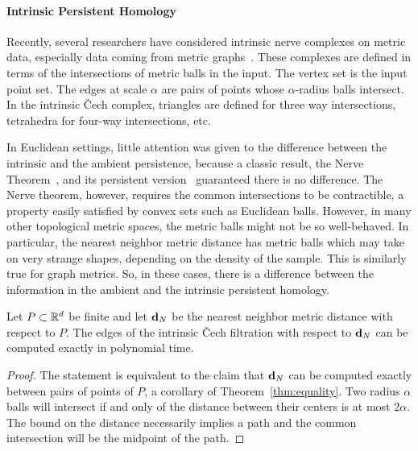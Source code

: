 

  \paragraph*{Intrinsic Persistent Homology}
    Recently, several researchers have considered intrinsic nerve complexes on metric data, especially data coming from metric graphs~\cite{adamszek16nerve,gasparovic17complete}.
    These complexes are defined in terms of the intersections of metric balls in the input.
    The vertex set is the input point set.
    The edges at scale $\alpha$ are pairs of points whose $\alpha$-radius balls intersect.
    In the intrinsic \v Cech complex, triangles are defined for three way intersections, tetrahedra for four-way intersections, etc.

    In Euclidean settings, little attention was given to the difference between the intrinsic and the ambient persistence, because a classic result, the Nerve Theorem~\cite{borsuk48imbedding}, and its persistent version~\cite{chazal08towards} guaranteed there is no difference.
    The Nerve theorem, however, requires the common intersections to be contractible, a property easily satisfied by convex sets such as Euclidean balls.
    However, in many other topological metric spaces, the metric
    balls might not be so well-behaved.
    In particular, the nearest neighbor metric distance has metric balls which may take on very strange shapes, depending on the density of the sample.
    This is similarly true for graph metrics.
    So, in these cases, there is a difference between the information in the ambient and the intrinsic persistent homology.

    \begin{theorem}
      Let $P\subset \mathbb{R}^d$ be finite and let $\mathbf{d}_N$ be the nearest neighbor metric distance with respect to $P$.
      The edges of the intrinsic \v Cech filtration with respect to $\mathbf{d}_N$ can be computed exactly in polynomial time.
    \end{theorem}
    \begin{proof}
      The statement is equivalent to the claim that $\mathbf{d}_N$ can be computed exactly between pairs of points of $P$, a corollary of Theorem~\ref{thm:equality}.
      Two radius $\alpha$ balls will intersect if and only of the distance between their centers is at most $2\alpha$.
      The bound on the distance necessarily implies a path and the common intersection will be the midpoint of the path.
    \end{proof}
